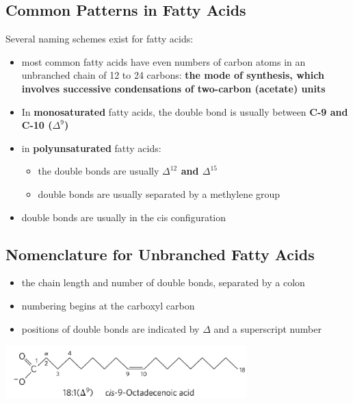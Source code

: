 \documentclass[10pt]{article}
\begin{document}
\subsection*{Common Patterns in Fatty Acids}
Several naming schemes exist for fatty acids:
\begin{itemize}
    \item most common fatty acids have even numbers of carbon atoms in an unbranched chain of 12 to 24 carbons: \textbf{the mode of synthesis, which involves successive condensations of two-carbon (acetate) units}
    \item In \textbf{monosaturated} fatty acids, the double bond is usually between \textbf{C-9 and C-10 ($\Delta^9$)}
    \item in \textbf{polyunsaturated} fatty acids:
    \begin{itemize}
        \item the double bonds are usually \textbf{$\Delta^{12}$ and $\Delta^{15}$}
        \item double bonds are usually separated by a methylene group
    \end{itemize}
    \item double bonds are usually in the cis configuration
\end{itemize}

\subsection*{Nomenclature for Unbranched Fatty Acids}
\begin{itemize}
    \item the chain length and number of double bonds, separated by a colon
    \item numbering begins at the carboxyl carbon
    \item positions of double bonds are indicated by $\Delta$ and a superscript number
\end{itemize}
\begin{center}
    \includegraphics*[width=0.7\textwidth]{L2_6.png}
\end{center}
\end{document}
